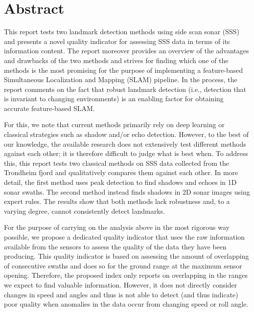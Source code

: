 \chapter*{Abstract}

This report tests two landmark detection methods using side scan sonar (SSS) and presents a novel quality indicator for assessing SSS data in terms of its information content. The report moreover provides an overview of the advantages and drawbacks of the two methods and strives for finding which one of the methods is the most promising for the purpose of implementing a feature-based Simultaneous Localization and Mapping (SLAM) pipeline. In the process, the report comments on the fact that robust landmark detection (i.e., detection that is invariant to changing environments) is an enabling factor for obtaining accurate feature-based SLAM. 

For this, we note that current methods primarily rely on deep learning or classical strategies such as shadow and/or echo detection. However, to the best of our knowledge, the available research does not extensively test different methods against each other; it is therefore difficult to judge what is best when. To address this, this report tests two classical methods on SSS data collected from the Trondheim fjord and qualitatively compares them against each other. In more detail, the first method uses peak detection to find shadows and echoes in 1D sonar swaths. The second method instead finds shadows in 2D sonar images using expert rules. The results show that both methods lack robustness and, to a varying degree, cannot consistently detect landmarks.

For the purpose of carrying on the analysis above in the most rigorous way possible, we propose a dedicated quality indicator that uses the raw information available from the sensors to assess the quality of the data they have been producing. This quality indicator is based on assessing the amount of overlapping of consecutive swaths and does so for the ground range at the maximum sensor opening. Therefore, the proposed index only reports on overlapping in the ranges we expect to find valuable information. However, it does not directly consider changes in speed and angles and thus is not able to detect (and thus indicate) poor quality when anomalies in the data occur from changing speed or roll angle. 
